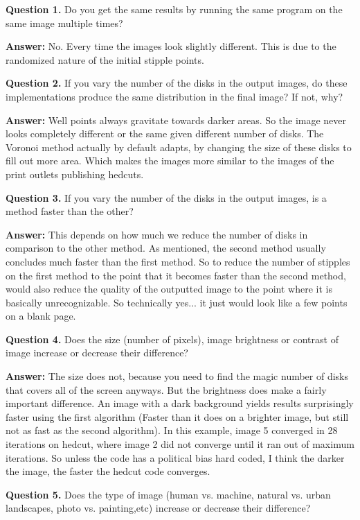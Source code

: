 \documentclass[11pt]{article}
\begin{document}
\textbf{Question 1.} Do you get the same results by running the same program on the same image multiple times?

\textbf{Answer:} No. Every time the images look slightly different. This is due to the randomized nature of the initial stipple points. 

\textbf{Question 2.} If you vary the number of the disks in the output images, do these implementations produce the same distribution in the final image? If not, why?

\textbf{Answer:} Well points always gravitate towards darker areas. So the image never looks completely different or the same  given different number of disks. The Voronoi method actually by default adapts, by changing the size of these disks to fill out more area. Which makes the images more similar to the images of the print outlets publishing hedcuts. 

\textbf{Question 3.} If you vary the number of the disks in the output images, is a method faster than the other?

\textbf{Answer:} This depends on how much we reduce the number of disks in comparison to the other method. As mentioned, the second method usually concludes much faster than the first method. So to reduce the number of stipples on the first method to the point that it becomes faster than the second method, would also reduce the quality of the outputted image to the point where it is basically unrecognizable. So technically yes... it just would look like a few points on a blank page.

\textbf{Question 4.} Does the size (number of pixels), image brightness or contrast of image increase or decrease their difference?

\textbf{Answer:} The size does not, because you need to find the magic number of disks that covers all of the screen anyways. But the brightness does make a fairly important difference. An image with a dark background yields results surprisingly faster using the first algorithm (Faster than it does on a brighter image, but still not as fast as the second algorithm). In this example, image 5 converged in 28 iterations on hedcut, where image 2 did not converge until it ran out of maximum iterations. So unless the code has a political bias hard coded, I think the darker the image, the faster the hedcut code converges. 

\textbf{Question 5.} Does the type of image (human vs. machine, natural vs. urban landscapes, photo vs. painting,etc) increase or decrease their difference?
\end{document}
